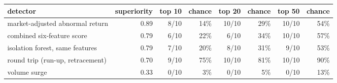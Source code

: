 \begin{tabular}{lrrrrrrr}
\toprule
detector & superiority & top 10 & chance & top 20 & chance & top 50 & chance \\
\midrule
market-adjusted abnormal return & 0.89 & 8/10 & 14\% & 10/10 & 29\% & 10/10 & 54\% \\
combined six-feature score & 0.79 & 6/10 & 22\% & 6/10 & 34\% & 10/10 & 57\% \\
isolation forest, same features & 0.79 & 7/10 & 20\% & 8/10 & 31\% & 9/10 & 53\% \\
round trip (run-up, retracement) & 0.70 & 9/10 & 75\% & 10/10 & 81\% & 10/10 & 90\% \\
volume surge & 0.33 & 0/10 & 3\% & 0/10 & 5\% & 0/10 & 13\% \\
\bottomrule
\end{tabular}
